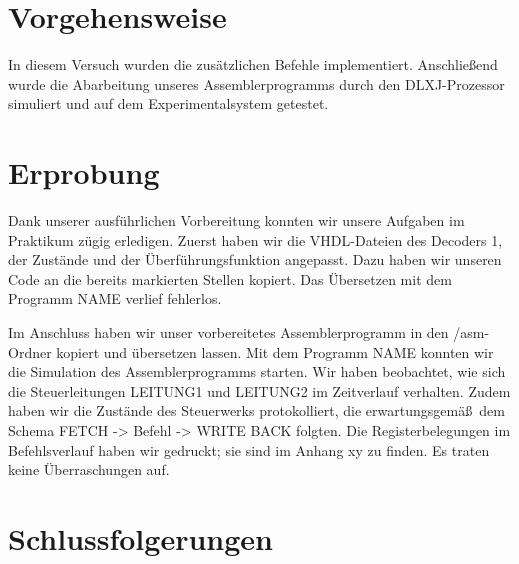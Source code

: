 \documentclass[12pt,a4paper]{scrartcl}
\begin{document}
\section{Vorgehensweise}
In diesem Versuch wurden die zus\"atzlichen Befehle implementiert.
Anschlie\ss end wurde die Abarbeitung unseres Assemblerprogramms durch den DLXJ-Prozessor simuliert und auf dem Experimentalsystem getestet.

\section{Erprobung}
Dank unserer ausf\"uhrlichen Vorbereitung konnten wir unsere Aufgaben im Praktikum z\"ugig erledigen.
Zuerst haben wir die VHDL-Dateien des Decoders 1, der Zust\"ande und der \"Uberf\"uhrungsfunktion angepasst.
Dazu haben wir unseren Code an die bereits markierten Stellen kopiert.
Das \"Ubersetzen mit dem Programm NAME verlief fehlerlos.

Im Anschluss haben wir unser vorbereitetes Assemblerprogramm in den /asm-Ordner kopiert und \"ubersetzen lassen.
Mit dem Programm NAME konnten wir die Simulation des Assemblerprogramms starten.
Wir haben beobachtet, wie sich die Steuerleitungen LEITUNG1 und LEITUNG2 im Zeitverlauf verhalten.
Zudem haben wir die Zust\"ande des Steuerwerks protokolliert, die erwartungsgem\"a\ss\  dem Schema FETCH -> Befehl -> WRITE BACK folgten.
Die Registerbelegungen im Befehlsverlauf haben wir gedruckt; sie sind im Anhang xy zu finden.
Es traten keine \"Uberraschungen auf.


\section{Schlussfolgerungen}
\end{document}
